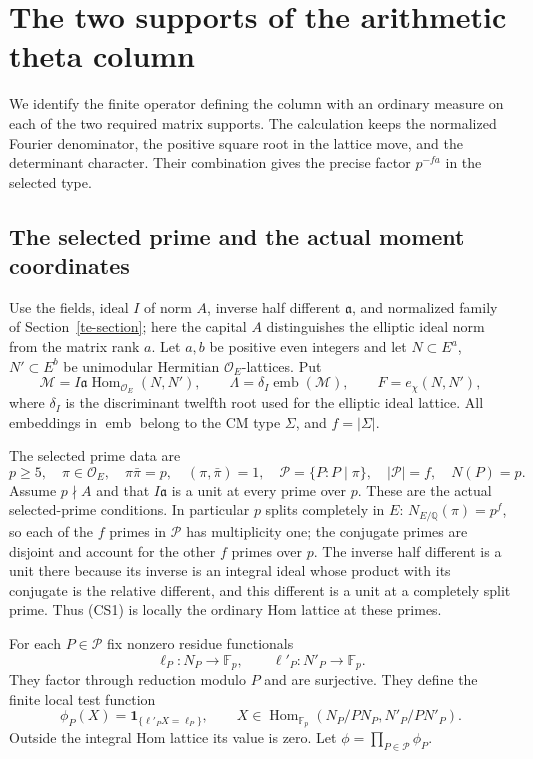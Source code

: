 \section{The two supports of the arithmetic theta column}
\label{csp-section}

We identify the finite operator defining the column with an
ordinary measure on each of the two required matrix supports.
The calculation keeps the normalized Fourier denominator,
the positive square root in the lattice move, and the
determinant character.  Their combination gives the precise
factor $p^{-fa}$ in the selected type.

\subsection{The selected prime and the actual moment coordinates}

Use the fields, ideal $I$ of norm $A$, inverse half different
$\mathfrak a$, and normalized family of
Section~\ref{te-section}; here the capital $A$ distinguishes
the elliptic ideal norm from the matrix rank $a$.
Let $a,b$ be positive even integers and let
$N\subset E^a$, $N'\subset E^b$ be unimodular Hermitian
$\mathcal O_E$-lattices.  Put
\[
 \mathcal M=I\mathfrak a\operatorname{Hom}_{\mathcal O_E}(N,N'),
 \qquad \Lambda=\delta_I\operatorname{emb}(\mathcal M),
                         \qquad F=e_\chi(N,N'),              \tag{CS1}
\]
where $\delta_I$ is the discriminant twelfth root used for
the elliptic ideal lattice.  All embeddings in $\operatorname{emb}$
belong to the CM type $\Sigma$, and $f=|\Sigma|$.

The selected prime data are
\[
 p\ge5,\quad \pi\in\mathcal O_E,\quad
 \pi\bar\pi=p,\quad (\pi,\bar\pi)=1,\quad
 \mathcal P=\{P:P\mid\pi\},\quad
                 |\mathcal P|=f,\quad N(P)=p.              \tag{CS2}
\]
Assume $p\nmid A$ and that $I\mathfrak a$ is a unit at
every prime over $p$.  These are the actual selected-prime
conditions.  In particular $p$ splits completely in $E$:
$N_{E/\mathbb Q}(\pi)=p^f$, so each of the $f$ primes in
$\mathcal P$ has multiplicity one; the conjugate primes
are disjoint and account for the other $f$ primes over $p$.
The inverse half different is a unit there because its inverse
is an integral ideal whose product with its conjugate is the
relative different, and this different is a unit at a completely
split prime.  Thus (CS1) is locally the ordinary Hom lattice
at these primes.

For each $P\in\mathcal P$ fix nonzero residue functionals
\[
 \ell_P:N_P\longrightarrow\mathbb F_p,\qquad
              \ell'_P:N'_P\longrightarrow\mathbb F_p.       \tag{CS3}
\]
They factor through reduction modulo $P$ and are surjective.
They define the finite local test function
\[
 \phi_P(X)=\mathbf1_{\{\ell'_PX=\ell_P\}},\qquad
             X\in\operatorname{Hom}_{\mathbb F_p}
                       (N_P/PN_P,N'_P/PN'_P).               \tag{CS4}
\]
Outside the integral Hom lattice its value is zero.
Let $\phi=\prod_{P\in\mathcal P}\phi_P$.

